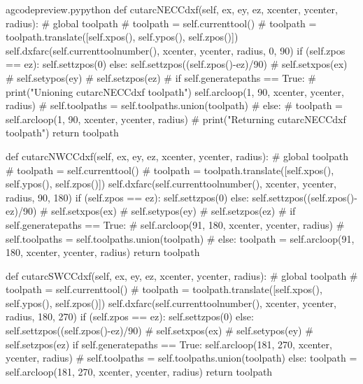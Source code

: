 \documentclass{ltxdoc}
\begin{document}
\lstset{firstnumber=\thegcpy}
\begin{writecode}{a}{gcodepreview.py}{python}
    def cutarcNECCdxf(self, ex, ey, ez, xcenter, ycenter, radius):
#        global toolpath
#        toolpath = self.currenttool()
#        toolpath = toolpath.translate([self.xpos(), self.ypos(), self.zpos()])
        self.dxfarc(self.currenttoolnumber(), xcenter, ycenter, radius, 0, 90)
        if (self.zpos == ez):
            self.settzpos(0)
        else:         
            self.settzpos((self.zpos()-ez)/90)
#        self.setxpos(ex)
#        self.setypos(ey)
#        self.setzpos(ez)
#        if self.generatepaths == True:
#            print("Unioning cutarcNECCdxf toolpath")
        self.arcloop(1, 90, xcenter, ycenter, radius)
#            self.toolpaths = self.toolpaths.union(toolpath)
#        else:
#            toolpath = self.arcloop(1, 90, xcenter, ycenter, radius)
#            print("Returning cutarcNECCdxf toolpath")
        return toolpath

    def cutarcNWCCdxf(self, ex, ey, ez, xcenter, ycenter, radius):
#        global toolpath
#        toolpath = self.currenttool()
#        toolpath = toolpath.translate([self.xpos(), self.ypos(), self.zpos()])
        self.dxfarc(self.currenttoolnumber(), xcenter, ycenter, radius, 90, 180)
        if (self.zpos == ez):
            self.settzpos(0)
        else:         
            self.settzpos((self.zpos()-ez)/90)
#        self.setxpos(ex)
#        self.setypos(ey)
#        self.setzpos(ez)
#        if self.generatepaths == True:
#            self.arcloop(91, 180, xcenter, ycenter, radius)
#            self.toolpaths = self.toolpaths.union(toolpath)
#        else:
        toolpath = self.arcloop(91, 180, xcenter, ycenter, radius)
        return toolpath

    def cutarcSWCCdxf(self, ex, ey, ez, xcenter, ycenter, radius):
#        global toolpath
#        toolpath = self.currenttool()
#        toolpath = toolpath.translate([self.xpos(), self.ypos(), self.zpos()])
        self.dxfarc(self.currenttoolnumber(), xcenter, ycenter, radius, 180, 270)
        if (self.zpos == ez):
            self.settzpos(0)
        else:         
            self.settzpos((self.zpos()-ez)/90)
#        self.setxpos(ex)
#        self.setypos(ey)
#        self.setzpos(ez)
        if self.generatepaths == True:
            self.arcloop(181, 270, xcenter, ycenter, radius)
#            self.toolpaths = self.toolpaths.union(toolpath)
        else:
            toolpath = self.arcloop(181, 270, xcenter, ycenter, radius)
            return toolpath


\end{writecode}
\end{document}
